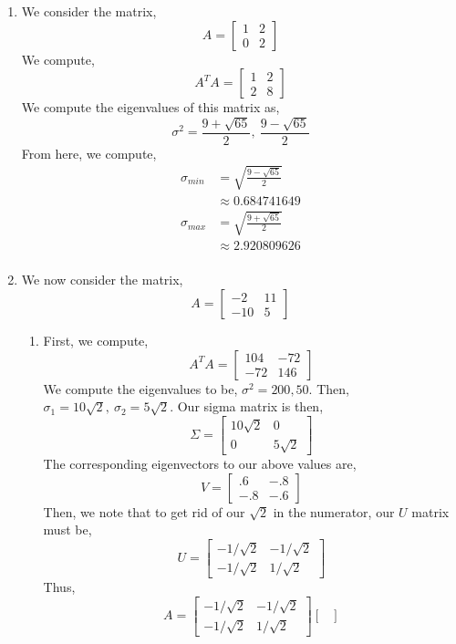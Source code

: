 \documentclass[letterpaper,10pt]{article}
\begin{document}
\begin{enumerate}
\item We consider the matrix,
\[A=\begin{bmatrix}
1 & 2\\0 & 2
\end{bmatrix}\]
We compute,
\[A^TA=\begin{bmatrix}
1 & 2\\2 & 8
\end{bmatrix} \]
We compute the eigenvalues of this matrix as,
\[\sigma^2=\frac{9+\sqrt{65}}{2},\ \frac{9-\sqrt{65}}{2}\]
From here, we compute,
\begin{align*}
\sigma_{min} &= \sqrt{\frac{9-\sqrt{65}}{2}}\\
&\approx 0.684741649\\
\sigma_{max} &= \sqrt{\frac{9+\sqrt{65}}{2}}\\
&\approx 2.920809626\\
\end{align*}
\item We now consider the matrix,
\[A=\begin{bmatrix}
-2 & 11\\-10 & 5
\end{bmatrix}\]
\begin{enumerate}
\item First, we compute,
\[A^TA=\begin{bmatrix}
104 & -72\\
-72 & 146
\end{bmatrix} \]
We compute the eigenvalues to be, $\sigma^2=200,50$. Then, $\sigma_1=10\sqrt{2},\ \sigma_2=5\sqrt{2}$. Our sigma matrix is then,
\[\Sigma=\begin{bmatrix}
10\sqrt{2} & 0\\0 & 5\sqrt{2}
\end{bmatrix} \]
The corresponding eigenvectors to our above values are,
\[V=\begin{bmatrix}
.6 & -.8\\
-.8 & -.6
\end{bmatrix}\]
Then, we note that to get rid of our $\sqrt{2}$ in the numerator, our $U$ matrix must be,
\[U=\begin{bmatrix}
-1/\sqrt{2} & -1/\sqrt{2}\\
-1/\sqrt{2} & 1/\sqrt{2}
\end{bmatrix} \]
Thus,
\[A=\begin{bmatrix}
-1/\sqrt{2} & -1/\sqrt{2}\\
-1/\sqrt{2} & 1/\sqrt{2}
\end{bmatrix}\begin{bmatrix}

\end{bmatrix}\]
\end{enumerate}
\end{enumerate}
\end{document}
